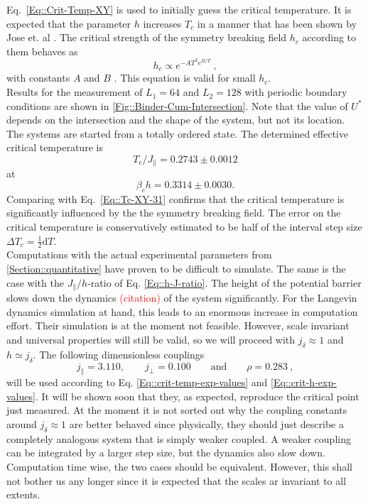 		Eq.~\eqref{Eq::Crit-Temp-XY} is used to initially guess the critical temperature. It is expected that the parameter $h$ increases $T_c$ in a manner that has been shown by Jose et. al \cite{jose1977renormalization}. The critical strength of the symmetry breaking field $h_c$ according to them behaves as
		\begin{equation} \label{Eq::h_c-T-dependence}
			h_c \propto e^{-AT^2 e^{B/T}}~,
		\end{equation}
		with constants $A$ and $B$ . This equation is valid for small $h_c$. \\
		
		 Results for the measurement of $L_1 =	64$ and $L_2 =	128$ with periodic boundary conditions are shown in \autoref{Fig::Binder-Cum-Intersection}. Note that the value of $U^*$ depends on the intersection and the shape of the system, but not its location.  The systems are started from a totally ordered state. The determined effective critical temperature is
		\begin{equation} \label{Eq::crit-temp-exp-values}
			T_c /	J_\parallel  = 0.2743 \pm 0.0012	
		\end{equation}
		at
		\begin{equation} \label{Eq::crit-h-exp-values}
			\beta_c h = 0.3314 \pm 0.0030.
		\end{equation}
		Comparing with Eq.~\eqref{Eq::Tc-XY-31} confirms that the critical temperature is significantly influenced by the the symmetry breaking field. The error on the critical temperature is conservatively estimated to be half of the interval step size $\Delta T_c =	\tfrac{1}{2} \text{d}T$. \\
		
		 Computations with the actual experimental parameters from \autoref{Section::quantitative} have proven to be difficult to simulate. The same is the case with the $J_\parallel / h$-ratio of Eq. \eqref{Eq::h-J-ratio}. The height of the potential barrier slows down the dynamics \textcolor{red}{(citation)} of the system significantly. For the Langevin dynamics simulation at hand, this leads to an enormous increase in computation effort.  Their simulation is at the moment not feasible. However, scale invariant and universal properties will still be valid, so we will proceed with $j_\delta \approx 1$ and $h \simeq j_\delta$. The following dimensionless couplings
		 \begin{equation} \label{Eq::good-dimensionless-parameters}
		 	j_\parallel =	3.110, \qquad j_\perp = 0.100 \qquad \text{and} \qquad \rho = 0.283 ~,
		 \end{equation}
	 	will be used according to Eq. \eqref{Eq::crit-temp-exp-values} and \eqref{Eq::crit-h-exp-values}. It will be shown soon that they, as expected, reproduce the critical point just measured. At the moment it is not sorted out why the coupling constants around $j_\delta \approx 1$ are better behaved since physically, they should just describe a completely analogous system that is simply weaker coupled. A weaker coupling can be integrated by a larger step size, but the dynamics also slow down. Computation time wise, the two cases should be equivalent. However, this shall not bother us any longer since it is expected that the scales ar invariant to all extents.
